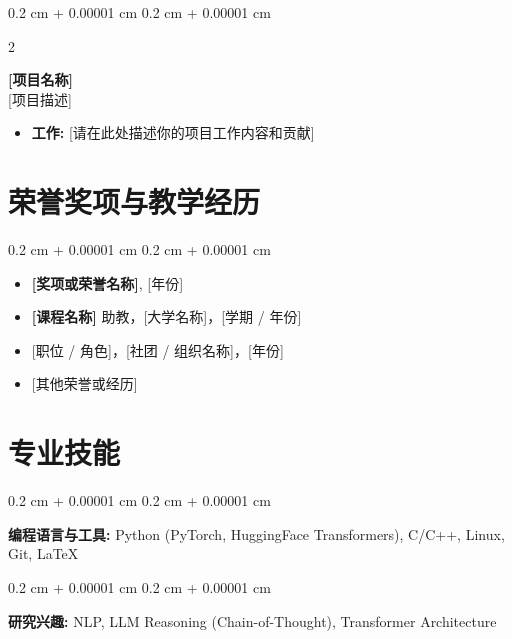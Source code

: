 \documentclass[10pt, letterpaper]{article}
\newenvironment{highlights}{
    \begin{itemize}[
        topsep=0.10 cm,
        parsep=0.10 cm,
        partopsep=0pt,
        itemsep=0pt,
        leftmargin=0.4 cm + 10pt
    ]
}{\end{itemize}} %
\newenvironment{highlightsforbulletentries}{
    \begin{itemize}[
        topsep=0.10 cm,
        parsep=0.10 cm,
        partopsep=0pt,
        itemsep=0pt,
        leftmargin=10pt
    ]
}{\end{itemize}} %
\newenvironment{onecolentry}{
    \begin{adjustwidth}{
        0.2 cm + 0.00001 cm
    }{
        0.2 cm + 0.00001 cm
    }
}{\end{adjustwidth}} %
\newenvironment{twocolentry}[2][]{\onecolentry
    \def\secondColumn{#2}
    \setcolumnwidth{\fill, 4.5 cm}
    \begin{paracol}{2}
}{\switchcolumn \raggedleft \secondColumn
    \end{paracol}
    \endonecolentry} %
\let\hrefWithoutArrow\href
\renewcommand{\href}[2]{\hrefWithoutArrow{#1}{\ifthenelse{\equal{#2}{}}{ }{#2 }\raisebox{.15ex}{\footnotesize \faExternalLink*}}}
\begin{document}
        \begin{twocolentry}{
            \href{[项目网址]}{[项目网址]}
        }
            \textbf{[项目名称]} \\
            {\small\textcolor{softGray}{[项目描述]}}
            \begin{highlights}
                \item \textbf{工作:} [请在此处描述你的项目工作内容和贡献]
            \end{highlights}
        \end{twocolentry}


    \section{荣誉奖项与教学经历}

        \begin{onecolentry}
            \begin{highlightsforbulletentries}
                \item \textbf{[奖项或荣誉名称]}, [年份] %
                \item \textbf{[课程名称]} 助教，[大学名称]，[学期 / 年份] %
                \item {[职位 / 角色]}，[社团 / 组织名称]，[年份] %
                \item {[其他荣誉或经历]} %
            \end{highlightsforbulletentries}
        \end{onecolentry}



    \section{专业技能}

        \begin{onecolentry}
            \textbf{编程语言与工具:} Python (PyTorch, HuggingFace Transformers), C/C++, Linux, Git, LaTeX
        \end{onecolentry}

        \vspace{0.2 cm}

        \begin{onecolentry}
            \textbf{研究兴趣:} NLP, LLM Reasoning (Chain-of-Thought), Transformer Architecture
        \end{onecolentry}
\end{document}
